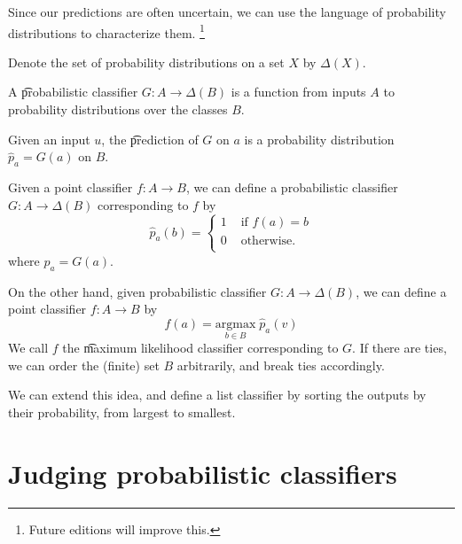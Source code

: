 

Since our predictions are often uncertain, we can use the language of probability distributions to characterize them.
  \ifhmode\unskip\fi\footnote{
Future editions will improve this.
  }


Denote the set of probability distributions on a set $X$ by $\Delta(X)$.

A \t{probabilistic classifier} $G: A \to \Delta(B)$ is a function from inputs $A$ to probability distributions over the classes $B$.

Given an input $u$, the \t{prediction} of $G$ on $a$ is a probability distribution $\hat{p}_a = G(a)$ on $B$.


Given a point classifier $f: A \to B$, we can define a probabilistic classifier $G: A \to \Delta(B)$ corresponding to $f$ by
  \[
\hat{p}_a(b) =
\begin{cases}
1 & \text{ if } f(a) = b \\
0 & \text{ otherwise.} \\
\end{cases}
  \]
where $\hat{p}_a = G(a).$


On the other hand, given probabilistic classifier $G: A \to \Delta(B)$, we can define a point classifier $f: A \to B$ by
  \[
f(a) = \underset{b \in B}{\text{argmax}} \; \hat{p}_a(v)
  \]
We call $f$ the \t{maximum likelihood classifier} corresponding to $G$.
If there are ties, we can order the (finite) set $B$ arbitrarily, and break ties accordingly.

We can extend this idea, and define a list classifier by sorting the outputs by their probability, from largest to smallest.

\section{Judging probabilistic classifiers}

\blankpage
